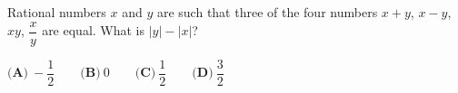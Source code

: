 Rational numbers $x$ and $y$ are such that three of the four numbers $x+y$, $x-y$, $xy$, $\dfrac {x}{y}$ are equal. What is $|y|-|x|$?

$\textbf{(A)}\ -\dfrac{1}{2}\qquad\textbf{(B)}\ 0\qquad\textbf{(C)}\ \dfrac{1}{2}\qquad\textbf{(D)}\ \dfrac{3}{2}$

